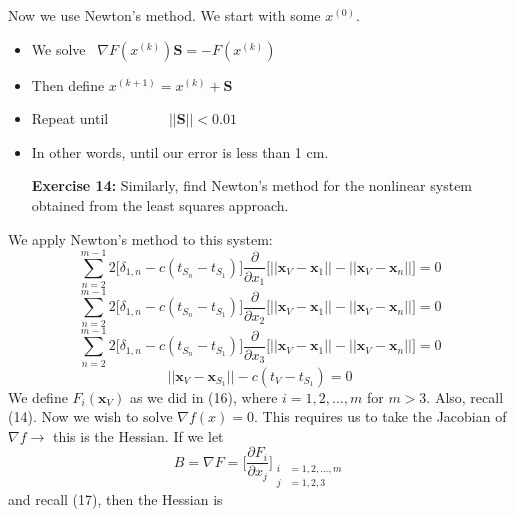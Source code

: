 \documentclass[11pt]{article}
\theoremstyle{definition}
\newcommand{\1}[1]{\mathbf{1} \left \{ #1 \right \}}
\begin{document}
Now we use Newton's method.  We start with some $x^{(0)}$.
\begin{itemize}
    \item We solve \ \qquad \(\nabla F(x^{(k)})\textbf{S} = -F(x^{(k)})\)
    \item Then define \qquad \quad  \(x^{(k+1)} = x^{(k)} + \textbf{S}\)
    \item Repeat until \(\qquad \qquad ||\textbf{S}|| < 0.01\)
    \item In other words, until our error is less than 1 cm.
\end{itemize}

\begin{itemize}
\item[{\textbf{Exercise 14:}}] Similarly, find Newton's method for the nonlinear system obtained from the least squares approach.
\end{itemize}
We apply Newton's method to this system:
\begin{equation*}
    \sum_{n=2}^{m-1} 2\big[\delta_{1,n} - c(t_{S_n} - t_{S_1})\big] \frac{\partial}{\partial x_1} \big[||\textbf{x}_V - \textbf{x}_1|| - ||\textbf{x}_V - \textbf{x}_n||\big] = 0
\end{equation*}
\begin{equation*}
    \sum_{n=2}^{m-1} 2\big[\delta_{1,n} - c(t_{S_n} - t_{S_1})\big] \frac{\partial}{\partial x_2} \big[||\textbf{x}_V - \textbf{x}_1|| - ||\textbf{x}_V - \textbf{x}_n||\big] = 0
\end{equation*}
\begin{equation*}
    \sum_{n=2}^{m-1} 2\big[\delta_{1,n} - c(t_{S_n} - t_{S_1})\big] \frac{\partial}{\partial x_3} \big[||\textbf{x}_V - \textbf{x}_1|| - ||\textbf{x}_V - \textbf{x}_n||\big] = 0
\end{equation*}
\begin{equation*}
    ||\textbf{x}_V - \textbf{x}_{S_1}|| - c(t_V - t_{S_1}) = 0
\end{equation*}
We define $F_i (\textbf{x}_V)$ as we did in (16), where $i = 1,2,...,m$ for $m>3$.  Also, recall (14).  Now we wish to solve $\nabla f(x) = 0$.  This requires us to take the Jacobian of $\nabla f \rightarrow$ this is the Hessian.  If we let
\[B = \nabla F = \Bigg[\frac{\partial F_i}{\partial x_j}\Bigg]_{\begin{split}
    i &= 1,2,...,m \\
    j &= 1,2,3
\end{split}}\]
and recall (17), then the Hessian is
\end{document}

